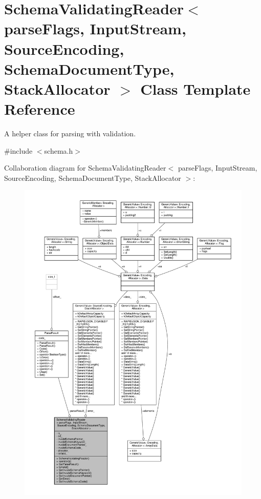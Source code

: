\hypertarget{classSchemaValidatingReader}{}\section{Schema\+Validating\+Reader$<$ parse\+Flags, Input\+Stream, Source\+Encoding, Schema\+Document\+Type, Stack\+Allocator $>$ Class Template Reference}
\label{classSchemaValidatingReader}


A helper class for parsing with validation.  




{\ttfamily \#include $<$schema.\+h$>$}



Collaboration diagram for Schema\+Validating\+Reader$<$ parse\+Flags, Input\+Stream, Source\+Encoding, Schema\+Document\+Type, Stack\+Allocator $>$\+:
\nopagebreak
\begin{figure}[H]
\begin{center}
\leavevmode
\includegraphics[width=350pt]{classSchemaValidatingReader__coll__graph}
\end{center}
\end{figure}
